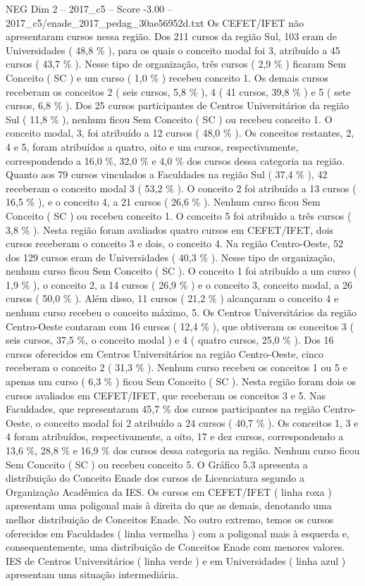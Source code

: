 \begin{textsample}{NEG Dim 2 – 2017\_c5 – Score -3.00 – 2017\_c5/enade\_2017\_pedag\_30ae56952d.txt}
Os CEFET/IFET não apresentaram cursos nessa região.
Dos 211 cursos da região Sul, 103 eram de Universidades ( 48,8 \% ), para os quais o conceito modal foi 3, atribuído a 45 cursos ( 43,7 \% ).
Nesse tipo de organização, três cursos ( 2,9 \% ) ficaram Sem Conceito ( SC ) e um curso ( 1,0 \% ) recebeu conceito 1.
Os demais cursos receberam os conceitos 2 ( seis cursos, 5,8 \% ), 4 ( 41 cursos, 39,8 \% ) e 5 ( sete cursos, 6,8 \% ).
Dos 25 cursos participantes de Centros Universitários da região Sul ( 11,8 \% ), nenhum ficou Sem Conceito ( SC ) ou recebeu conceito 1.
O conceito modal, 3, foi atribuído a 12 cursos ( 48,0 \% ).
Os conceitos restantes, 2, 4 e 5, foram atribuídos a quatro, oito e um cursos, respectivamente, correspondendo a 16,0 \%, 32,0 \% e 4,0 \% dos cursos dessa categoria na região.
Quanto aos 79 cursos vinculados a Faculdades na região Sul ( 37,4 \% ), 42 receberam o conceito modal 3 ( 53,2 \% ).
O conceito 2 foi atribuído a 13 cursos ( 16,5 \% ), e o conceito 4, a 21 cursos ( 26,6 \% ).
Nenhum curso ficou Sem Conceito ( SC ) ou recebeu conceito 1.
O conceito 5 foi atribuído a três cursos ( 3,8 \% ).
Nesta região foram avaliados quatro cursos em CEFET/IFET, dois cursos receberam o conceito 3 e dois, o conceito 4.
Na região Centro-Oeste, 52 dos 129 cursos eram de Universidades ( 40,3 \% ).
Nesse tipo de organização, nenhum curso ficou Sem Conceito ( SC ).
O conceito 1 foi atribuído a um curso ( 1,9 \% ), o conceito 2, a 14 cursos ( 26,9 \% ) e o conceito 3, conceito modal, a 26 cursos ( 50,0 \% ).
Além disso, 11 cursos ( 21,2 \% ) alcançaram o conceito 4 e nenhum curso recebeu o conceito máximo, 5.
Os Centros Universitários da região Centro-Oeste contaram com 16 cursos ( 12,4 \% ), que obtiveram os conceitos 3 ( seis cursos, 37,5 \%, o conceito modal ) e 4 ( quatro cursos, 25,0 \% ).
Dos 16 cursos oferecidos em Centros Universitários na região Centro-Oeste, cinco receberam o conceito 2 ( 31,3 \% ).
Nenhum curso recebeu os conceitos 1 ou 5 e apenas um curso ( 6,3 \% ) ficou Sem Conceito ( SC ).
Nesta região foram dois os cursos avaliados em CEFET/IFET, que receberam os conceitos 3 e 5.
Nas Faculdades, que representaram 45,7 \% dos cursos participantes na região Centro-Oeste, o conceito modal foi 2 atribuído a 24 cursos ( 40,7 \% ).
Os conceitos 1, 3 e 4 foram atribuídos, respectivamente, a oito, 17 e dez cursos, correspondendo a 13,6 \%, 28,8 \% e 16,9 \% dos cursos dessa categoria na região.
Nenhum curso ficou Sem Conceito ( SC ) ou recebeu conceito 5.
O Gráfico 5.3 apresenta a distribuição do Conceito Enade dos cursos de Licenciatura segundo a Organização Acadêmica da IES.
Os cursos em CEFET/IFET ( linha roxa ) apresentam uma poligonal mais à direita do que as demais, denotando uma melhor distribuição de Conceitos Enade.
No outro extremo, temos os cursos oferecidos em Faculdades ( linha vermelha ) com a poligonal mais à esquerda e, consequentemente, uma distribuição de Conceitos Enade com menores valores.
IES de Centros Universitários ( linha verde ) e em Universidades ( linha azul ) apresentam uma situação intermediária.

\end{textsample}
